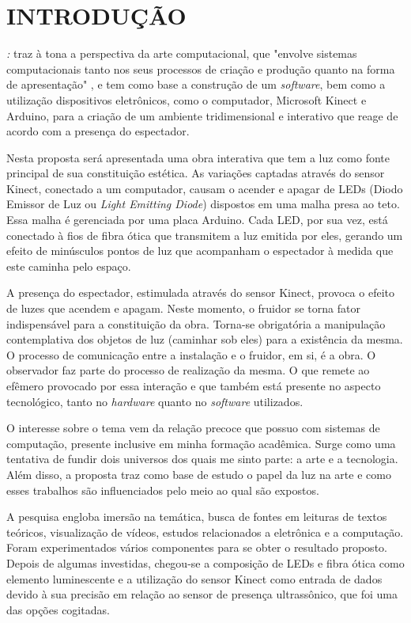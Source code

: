 %
%

\chapter{INTRODUÇÃO}\label{chap:introducao}

\textit{{\imprimirtitulotb}: {\imprimirsubtitulo}} traz à tona a perspectiva da arte computacional, que "envolve sistemas computacionais tanto nos seus processos de criação e produção quanto na forma de apresentação" \cite[p. 36]{boone}, e tem como base a construção de um \textit{software}, bem como a utilização dispositivos eletrônicos, como o computador, Microsoft Kinect e Arduino, para a criação de um ambiente tridimensional e interativo que reage de acordo com a presença do espectador.

Nesta proposta será apresentada uma obra interativa que tem a luz como fonte principal de sua constituição estética. As variações captadas através do sensor Kinect, conectado a um computador, causam o acender e apagar de LEDs (Diodo Emissor de Luz ou \textit{Light Emitting Diode}) dispostos em uma malha presa ao teto. Essa malha é gerenciada por uma placa Arduino. Cada LED, por sua vez, está conectado à fios de fibra ótica que transmitem a luz emitida por eles, gerando um efeito de minúsculos pontos de luz que acompanham o espectador à medida que este caminha pelo espaço.

A presença do espectador, estimulada através do sensor Kinect, provoca o efeito de luzes que acendem e apagam. Neste momento, o fruidor se torna fator indispensável para a constituição da obra. Torna-se obrigatória a manipulação contemplativa dos objetos de luz  (caminhar sob eles) para a existência da mesma. O processo de comunicação entre a instalação e o fruidor, em si, é a obra. O observador faz parte do processo de realização da mesma. O que remete ao efêmero provocado por essa interação e que também está presente no aspecto tecnológico, tanto no \textit{hardware} quanto no \textit{software} utilizados. 

O interesse sobre o tema vem da relação precoce que possuo com sistemas de computação, presente inclusive em minha formação acadêmica. Surge como uma tentativa de fundir dois universos dos quais me sinto parte: a arte e a tecnologia. Além disso, a proposta traz como base de estudo o papel da luz na arte e como esses trabalhos são influenciados pelo meio ao qual são expostos.

A pesquisa engloba imersão na temática, busca de fontes em leituras de textos teóricos, visualização de vídeos, estudos relacionados a eletrônica e a computação. Foram experimentados vários componentes para se obter o resultado proposto. Depois de algumas investidas, chegou-se a composição de LEDs e fibra ótica como elemento luminescente e a utilização do sensor Kinect como entrada de dados devido à sua precisão em relação ao sensor de presença ultrassônico, que foi uma das opções cogitadas.
